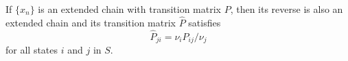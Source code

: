 If $\{x_n\}$ is an extended chain with transition matrix $P$, then its reverse is also an extended chain and its transition matrix $\hat{P}$ satisfies
$$\hat{P}_{ji} = \nu_i P_{ij} / \nu_j$$
for all states $i$ and $j$ in $S$.

